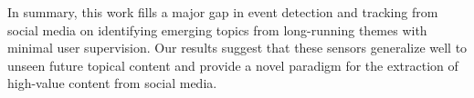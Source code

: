 In summary, this work fills a major gap in 
event detection and tracking from social media
on identifying emerging topics from long-running themes with
minimal user supervision.  Our results suggest that these
sensors generalize well to unseen future topical content and provide a
novel paradigm for the extraction of high-value content from social
media.


%
%
